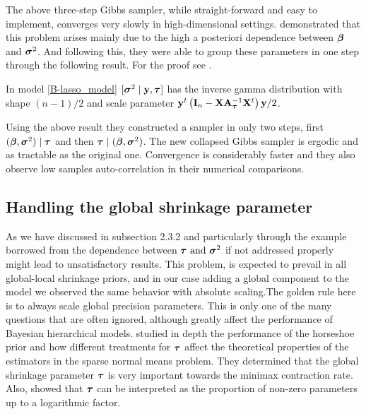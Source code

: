 \documentclass[chapters]{uamaththesis}
\begin{document}
The above three-step Gibbs sampler, while straight-forward and easy to implement, converges very slowly in high-dimensional settings. \cite{Rajaratnam2017Gibbs} demonstrated that this problem arises mainly due to the high a posteriori dependence between $\boldsymbol{\beta}$ and $\boldsymbol{\sigma}^2$. And following this, they were able to group these parameters in one step through the following result. For the proof see \cite{Rajaratnam2017Gibbs}.

\begin{lemma}\label{sigma_collapsed}
In model \eqref{B-lasso_model} $[ \boldsymbol{\sigma}^2 \mid {\bf y} ,\boldsymbol{\tau} ]$ has the inverse gamma distribution with shape $(n-1)/2$ and scale parameter ${\bf y}^{t}\left( {\bf I}_n - {\bf X}{\bf A}_{\boldsymbol{\tau}}^{-1}{\bf X}^{t} \right){\bf y} /2 $.
\end{lemma}
Using the above result they constructed a sampler in only two steps, first $(\boldsymbol{\beta} , \boldsymbol{\sigma}^2) \mid  \boldsymbol{\tau}$ and then $\boldsymbol{\tau} \mid (\boldsymbol{\beta} , \boldsymbol{\sigma}^2)$. The new collapsed Gibbs sampler is ergodic and as tractable as the original one. Convergence is considerably faster and they also observe low samples auto-correlation in their numerical comparisons.


\subsection{Handling the global shrinkage parameter}

As we have discussed in subsection 2.3.2 and particularly through the example borrowed from \cite{polson2010shrink} the dependence between $\boldsymbol{\tau} \text{ and } \boldsymbol{\sigma}^{2}$ if not addressed properly might lead to unsatisfactory results. This problem, is expected to prevail in all global-local shrinkage priors, and in our case adding a global component to the model we observed the same behavior with absolute scaling.The golden rule here is to always scale global precision parameters. This is only one of the many questions that are often ignored, although greatly affect the performance of Bayesian hierarchical models. \cite{van2017adaptive} studied in depth the performance of the horseshoe prior and how different treatments for $\boldsymbol{\tau}$ affect the theoretical properties of the estimators in the sparse normal means problem. They determined that the global shrinkage parameter $\boldsymbol{\tau}$ is very important towards the minimax contraction rate. Also, \cite{van2014horseshoe} showed that $\boldsymbol{\tau}$ can be interpreted as the proportion of non-zero parameters up to a logarithmic factor.
\end{document}

